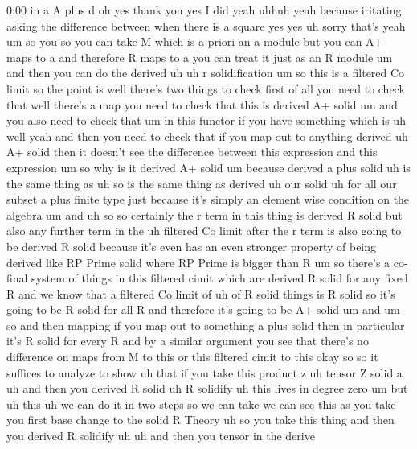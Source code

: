\begin{unfinished}{0:00}
in  a  A  plus  d  oh  yes  thank  you  yes  I  did
yeah
uhhuh  yeah
because  iritating  asking  the  difference
between  when  there  is  a  square  yes  yes
uh  sorry  that's  yeah  um  so  you  so  you
can  take  M  which  is  a  priori  an  a  module
but  you  can  A+  maps  to  a  and  therefore  R
maps  to  a  you  can  treat  it  just  as  an  R
module  um  and  then  you  can  do  the
derived  uh  uh  r
solidification
um  so  this  is  a  filtered  Co  limit  so  the
point  is  well  there's  two  things  to
check  first  of  all  you  need  to  check
that  well  there's  a  map  you  need  to
check  that  this  is  derived  A+
solid  um  and  you  also  need  to  check  that
um  in  this  functor  if  you  have  something
which  is  uh
well  yeah  and  then  you  need  to  check
that  if  you  map  out  to  anything  derived
uh  A+  solid  then  it  doesn't  see  the
difference  between  this  expression  and
this
expression  um  so  why  is  it  derived  A+
solid  um  because  derived  a  plus  solid  uh
is  the  same  thing  as  uh
so  is  the  same  thing  as
derived  uh  our
solid  uh  for  all  our  subset  a  plus
finite  type  just  because  it's  simply  an
element  wise  condition  on  the
algebra  um  and  uh  so  so  certainly  the  r
term  in  this  thing  is  derived  R  solid
but  also  any  further  term  in  the  uh
filtered  Co  limit  after  the  r  term  is
also  going  to  be  derived  R  solid  because
it's  even  has  an  even  stronger  property
of  being  derived  like  RP  Prime  solid
where  RP  Prime  is  bigger  than  R  um  so
there's  a  co-  final  system  of  things  in
this  filtered  cimit  which  are  derived  R
solid  for  any  fixed  R  and  we  know  that  a
filtered  Co  limit  of  uh  of  R  solid
things  is  R  solid  so  it's  going  to  be  R
solid  for  all  R  and  therefore  it's  going
to  be  A+
solid
um  and
um  so  and  then  mapping  if  you  map  out  to
something  a  plus  solid  then  in
particular  it's  R  solid  for  every  R  and
by  a  similar  argument  you  see  that
there's  no  difference  on  maps  from  M  to
this  or  this  filtered  cimit  to  this
okay
so  so  it  suffices  to
analyze  to  show  uh  that  if  you  take  this
product
z  uh  tensor
Z  solid  a  uh  and  then  you  derived  R
solid  uh  R
solidify  uh  this  lives  in  degree
zero  um  but
uh
this  uh  we  can  do  it  in  two  steps  so  we
can  take  we  can  see  this  as  you  take  you
first  base  change  to  the  solid  R  Theory
uh  so  you  take  this  thing  and  then  you
derived  R
solidify  uh
uh  and  then  you  tensor  in  the  derive

\end{unfinished}
